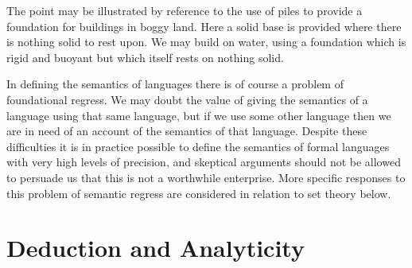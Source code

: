 \documentclass{rbjk}
\newcommand{\ignore}[1]{}
\begin{document}
\begin{article}
{The point may be illustrated by reference to the use of piles to provide a foundation for buildings in boggy land.
Here a solid base is provided where there is nothing solid to rest upon.
We may build on water, using a foundation which is rigid and buoyant but which itself rests on nothing solid.

In defining the semantics of languages there is of course a problem of foundational regress.
We may doubt the value of giving the semantics of a language using that same language, but if we use some other language then we are in need of an account of the semantics of that language.
Despite these difficulties it is in practice possible to define the semantics of formal languages with very high levels of precision, and skeptical arguments should not be allowed to persuade us that this  is not a worthwhile enterprise.
More specific responses to this problem of semantic regress are considered in relation to set theory below.

}

\section{Deduction and Analyticity}

\ignore{
I propose lightly to sketch in this section a connection between the scope of deductive reasoning and the concept of analyticity.

The discussion relates exclusively to the relation between deductive reasoning in formal deductive systems which are sound relative to an appropriate semantics, and the concept of analyticity as applied to sentences in formal languages with similar semantics.

First let me mention some generally accepted desiderata for formal deductive systems.
Except in the (relatively rare) case where a deductive system is considered purely as a formal calculus, and is intended to have no interpretation, a formal deductive system when constructed is given a semantics and is proven to be consistent with the semantics.
If the deductive system is complete with respect to that semantics then this would also be proven.
Whether or not these proofs are undertaken, it is a generally accepted desiderata for deductive systems that they are sound.

I will expand upon these notions shortly, but first I state the elementary connection which is here alleged.
The conclusions of proofs in sound formal deductive systems are the formal analytic truths (i.e. the set of sentences in formal languages which are analytic).
Thus the concept of analyticity precisely circumscribes the scope of sound deductive reasoning, at least in the realm of formal languages.

}
\end{article}
\end{document}

